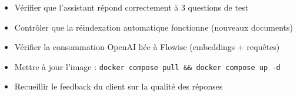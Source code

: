 \documentclass[11pt, a4paper]{article}
\begin{document}
\begin{checklist}
  \begin{itemize}
    \item[$\square$] Vérifier que l'assistant répond correctement à 3 questions de test
    \item[$\square$] Contrôler que la réindexation automatique fonctionne (nouveaux documents)
    \item[$\square$] Vérifier la consommation OpenAI liée à Flowise (embeddings + requêtes)
    \item[$\square$] Mettre à jour l'image : \texttt{docker compose pull \&\& docker compose up -d}
    \item[$\square$] Recueillir le feedback du client sur la qualité des réponses
  \end{itemize}
\end{checklist}
\end{document}
